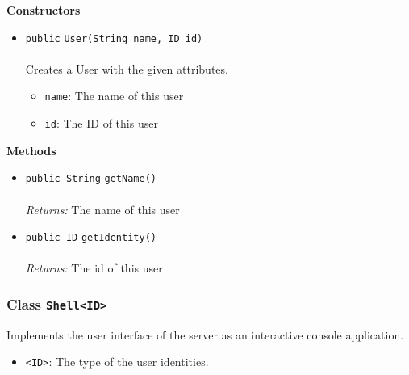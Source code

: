 \textbf{\sffamily Constructors}
\begin{itemize}
\item \lstinline|public| \lstinline|User|\lstinline|(String name, ID id)|\\ \\[-0.6em]
Creates a User with the given attributes.
\begin{itemize}
\item \lstinline|name|: The name of this user
\item \lstinline|id|: The ID of this user
\end{itemize}



\end{itemize}


\textbf{\sffamily Methods}
\begin{itemize}
\item \lstinline|public String| \lstinline|getName|\lstinline|()|\\ \\[-0.6em]
\emph{Returns:} The name of this user



\item \lstinline|public ID| \lstinline|getIdentity|\lstinline|()|\\ \\[-0.6em]
\emph{Returns:} The id of this user



\end{itemize}

\subsubsection{Class \lstinline|Shell<ID>|}
Implements the user interface of the server as an interactive console application. \\
\noindent\begin{minipage}[t]{5cm}
\vspace{0.3em}
\hspace*{2em}
\vspace{0.3em}
\end{minipage}

\begin{itemize}
\item \lstinline|<ID>|: The type of the user identities.
\end{itemize}


